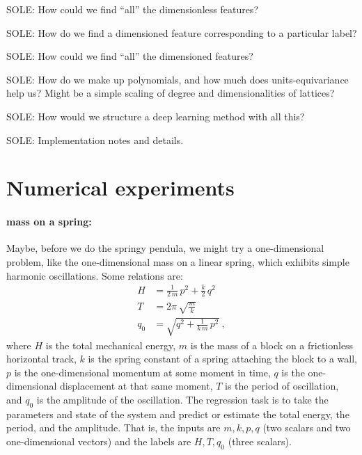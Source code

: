 \documentclass[12pt, letterpaper]{article}
\begin{document}
SOLE: How could we find ``all'' the dimensionless features?

SOLE: How do we find a dimensioned feature corresponding to a particular label?

SOLE: How could we find ``all'' the dimensioned features?

SOLE: How do we make up polynomials, and how much does units-equivariance help us? Might be a simple scaling of degree and dimensionalities of lattices?

SOLE: How would we structure a deep learning method with all this?

SOLE: Implementation notes and details.

\section{Numerical experiments}

\paragraph{mass on a spring:} Maybe, before we do the springy pendula, we might try a one-dimensional problem, like the one-dimensional mass on a linear spring, which exhibits simple harmonic oscillations. Some relations are:
\begin{align}
    H &= \frac{1}{2\,m}\,p^2 + \frac{k}{2}\,q^2 \\
    T &= 2\pi\,\sqrt{\frac{m}{k}} \\
    q_0 &= \sqrt{q^2 + \frac{1}{k\,m}\,p^2} ~,
\end{align}
where $H$ is the total mechanical energy, $m$ is the mass of a block on a frictionless horizontal track, $k$ is the spring constant of a spring attaching the block to a wall, $p$ is the one-dimensional momentum at some moment in time, $q$ is the one-dimensional displacement at that same moment, $T$ is the period of oscillation, and $q_0$ is the amplitude of the oscillation.
The regression task is to take the parameters and state of the system and predict or estimate the total energy, the period, and the amplitude.
That is, the inputs are $m,k,p,q$ (two scalars and two one-dimensional vectors) and the labels are $H,T,q_0$ (three scalars).
\end{document}
